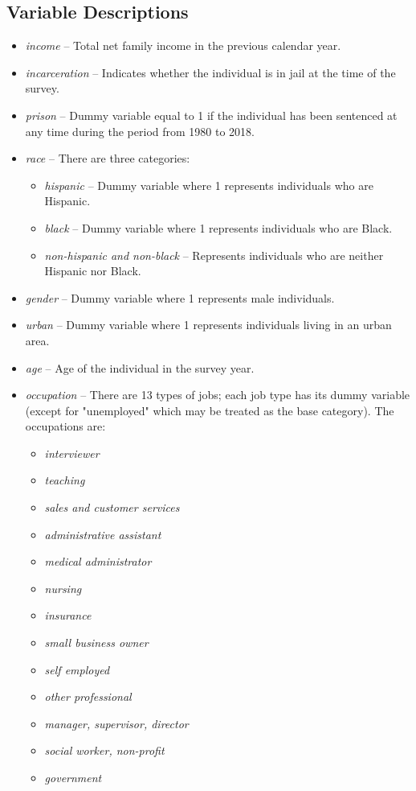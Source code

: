 \documentclass{article}[12pt]
\begin{document}
\subsection*{Variable Descriptions}
\begin{itemize}
    \item \textit{income} -- Total net family income in the previous calendar year.
    \item \textit{incarceration} -- Indicates whether the individual is in jail at the time of the survey.
    \item \textit{prison} -- Dummy variable equal to 1 if the individual has been sentenced at any time during the period from 1980 to 2018.
    \item \textit{race} -- There are three categories:
    \begin{itemize}
        \item \textit{hispanic} -- Dummy variable where 1 represents individuals who are Hispanic.
        \item \textit{black} -- Dummy variable where 1 represents individuals who are Black.
        \item \textit{non-hispanic and non-black} -- Represents individuals who are neither Hispanic nor Black.
    \end{itemize}
    \item \textit{gender} -- Dummy variable where 1 represents male individuals.
    \item \textit{urban} -- Dummy variable where 1 represents individuals living in an urban area.
    \item \textit{age} -- Age of the individual in the survey year.
    \item \textit{occupation} -- There are 13 types of jobs; each job type has its dummy variable (except for "unemployed" which may be treated as the base category). The occupations are:
    \begin{itemize}
        \item \textit{interviewer}
        \item \textit{teaching}
        \item \textit{sales and customer services}
        \item \textit{administrative assistant}
        \item \textit{medical administrator}
        \item \textit{nursing}
        \item \textit{insurance}
        \item \textit{small business owner}
        \item \textit{self employed}
        \item \textit{other professional}
        \item \textit{manager, supervisor, director}
        \item \textit{social worker, non-profit}
        \item \textit{government}
    \end{itemize}
\end{itemize}
\end{document}
